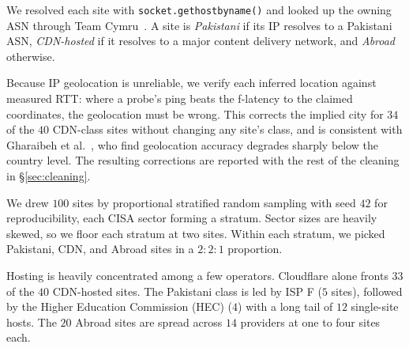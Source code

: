 \documentclass[sigconf,anonymous,10pt]{acmart}
\begin{document}
We resolved each site with \texttt{socket.gethostbyname()} and looked up the owning ASN through Team Cymru~\cite{cymru}. A site is \textit{Pakistani} if its IP resolves to a Pakistani ASN, \textit{CDN-hosted} if it resolves to a major content delivery network, and \textit{Abroad} otherwise.

Because IP geolocation is unreliable, we verify each inferred location against measured RTT: where a probe's ping beats the f-latency to the claimed coordinates, the geolocation must be wrong. This corrects the implied city for $34$ of the $40$ CDN-class sites without changing any site's class, and is consistent with Gharaibeh et al.~\cite{gharaibeh:imc:2011}, who find geolocation accuracy degrades sharply below the country level. The resulting corrections are reported with the rest of the cleaning in \S\ref{sec:cleaning}.

We drew $100$ sites by proportional stratified random sampling with seed $42$ for reproducibility, each CISA sector forming a stratum. Sector sizes are heavily skewed, so we floor each stratum at two sites. Within each stratum, we picked Pakistani, CDN, and Abroad sites in a $2:2:1$ proportion.

Hosting is heavily concentrated among a few operators. Cloudflare alone fronts $33$ of the $40$ CDN-hosted sites. The Pakistani class is led by ISP F ($5$ sites), followed by the Higher Education Commission (HEC) ($4$) with a long tail of $12$ single-site hosts. The $20$ Abroad sites are spread across $14$ providers at one to four sites each.


\end{document}
